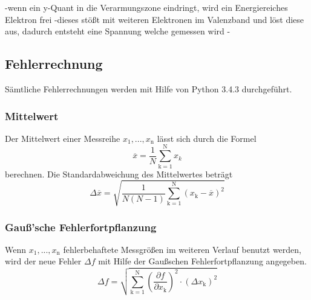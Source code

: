 -wenn ein y-Quant in die Verarmungszone eindringt, wird ein Energiereiches Elektron frei
-dieses stößt mit weiteren Elektronen im Valenzband und löst diese aus, dadurch entsteht eine Spannung welche gemessen wird
-






























\subsection{Fehlerrechnung}
Sämtliche Fehlerrechnungen werden mit Hilfe von Python 3.4.3 durchgeführt.
\subsubsection{Mittelwert}
Der Mittelwert einer Messreihe $x_\text{1}, ... ,x_\text{n}$ lässt sich durch die Formel
\begin{equation}
	\overline{x} = \frac{1}{N} \sum_{\text{k}=1}^\text{N} x_k
	\label{eqn:ave}
\end{equation}
berechnen. Die Standardabweichung des Mittelwertes beträgt
\begin{equation}
	\Delta \overline{x} = \sqrt{ \frac{1}{N(N-1)} \sum_{\text{k}=1}^\text{N} (x_\text{k} - \overline{x})^2}
	\label{eqn:std}
\end{equation}

\subsubsection{Gauß'sche Fehlerfortpflanzung}
Wenn $x_\text{1}, ..., x_\text{n}$ fehlerbehaftete Messgrößen im weiteren Verlauf benutzt werden, wird der neue Fehler $\Delta f$ mit Hilfe der Gaußschen Fehlerfortpflanzung angegeben.
\begin{equation}
	\Delta f = \sqrt{\sum_{\text{k}=1}^\text{N} \left( \frac{ \partial f}{\partial x_\text{k}} \right) ^2 \cdot (\Delta x_\text{k})^2}
	\label{eqn:var}
\end{equation}

